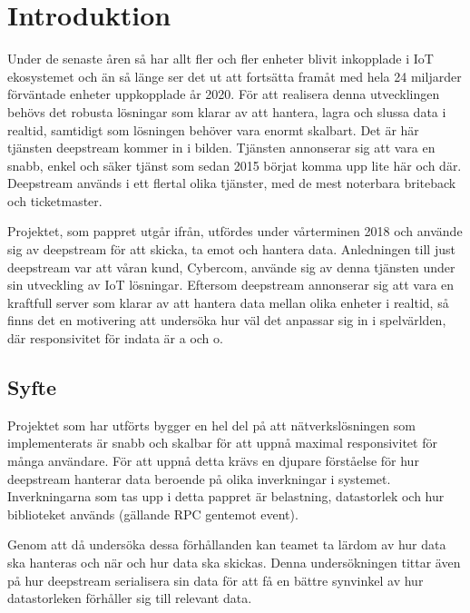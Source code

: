 \section{Introduktion}

Under de senaste åren så har allt fler och fler enheter blivit inkopplade i IoT ekosystemet och än så länge ser det ut att fortsätta framåt med hela 24 miljarder förväntade enheter uppkopplade år 2020\cite{IoT-ecosystem}. För att realisera denna utvecklingen behövs det robusta lösningar som klarar av att hantera, lagra och slussa data i realtid, samtidigt som lösningen behöver vara enormt skalbart. Det är här tjänsten deepstream\cite{deepstream} kommer in i bilden. Tjänsten annonserar sig att vara en snabb, enkel och säker tjänst som sedan 2015 börjat komma upp lite här och där. Deepstream används i ett flertal olika tjänster, med de mest noterbara briteback och ticketmaster\cite{ds-usecases}.

Projektet, som pappret utgår ifrån, utfördes under vårterminen 2018 och använde sig av deepstream för att skicka, ta emot och hantera data. Anledningen till just deepstream var att våran kund, Cybercom, använde sig av denna tjänsten under sin utveckling av IoT lösningar. Eftersom deepstream annonserar sig att vara en kraftfull server som klarar av att hantera data mellan olika enheter i realtid, så finns det en motivering att undersöka hur väl det anpassar sig in i spelvärlden, där responsivitet för indata är a och o.

\subsection{Syfte}
\label{subsec:tim-aim}
Projektet som har utförts bygger en hel del på att nätverkslösningen som implementerats är snabb och skalbar för att uppnå maximal responsivitet för många användare. För att uppnå detta krävs en djupare förståelse för hur deepstream hanterar data beroende på olika inverkningar i systemet. Inverkningarna som tas upp i detta pappret är belastning, datastorlek och hur biblioteket används (gällande RPC gentemot event).

Genom att då undersöka dessa förhållanden kan teamet ta lärdom av hur data ska hanteras och när och hur data ska skickas. Denna undersökningen tittar även på hur deepstream serialisera sin data för att få en bättre synvinkel av hur datastorleken förhåller sig till relevant data.

